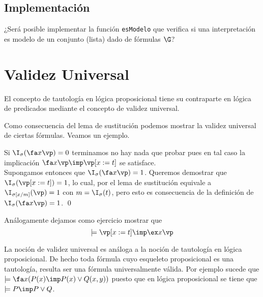 \documentclass[11pt,letterpaper]{article}
\begin{document}
\subsection{Implementación}

¿Será posible implementar la función {\tt esModelo} que verifica si una interpretación es modelo de un  conjunto (lista) dado de fórmulas $\G$?



\section{Validez Universal} 

El concepto de tautología en lógica proposicional tiene su contraparte
en lógica de predicados mediante el concepto de validez universal. 



Como consecuencia del lema de sustitución podemos mostrar la validez universal
de ciertas fórmulas. Veamos un ejemplo.

  \proof
  Si $\inu(\fa x\vp)=0$ terminamos no hay nada que probar pues en tal caso la
  implicación $\fa x\vp\imp\vp[x:=t]$ se satisface. \\
  Supongamos entonces que $\inu(\fa x\vp)=1$. Queremos demostrar que 
  $\inu(\vp[x:=t])=1$, lo cual, por el lema de sustitución equivale a 
  $\I_{\sigma[x/m]}(\vp)=1$ con $m=\inu(t)$, pero esto es consecuencia de la 
  definición de $\inu(\fa x\vp)=1$.
  \qed

  \espc

\noindent Análogamente dejamos como ejercicio mostrar que 
$$ \models \vp[x:=t]\imp \ex x\vp $$

La noción de validez universal es análoga a la noción de tautología en lógica proposicional. De hecho toda fórmula cuyo esqueleto proposicional es una tautología, resulta ser una fórmula universalmente válida. 
Por ejemplo sucede que 
$\models\fa x(P(x)\imp P(x)\lor Q(x,y))$  puesto que en lógica proposicional se tiene que $\models P\imp P\lor Q$.
\end{document}
